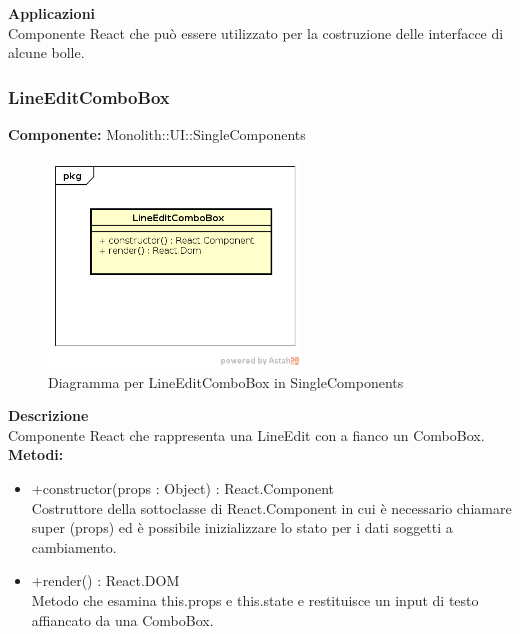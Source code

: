 \textbf{Applicazioni}\\
Componente React che può essere utilizzato per la costruzione delle interfacce di alcune bolle. 


\clearpage

\subsubsection{LineEditComboBox}
\textbf{Componente:}  Monolith::UI::SingleComponents\\
   \FloatBarrier
   \begin{figure}[ht]
   \centering
   \includegraphics[width=0.6\textwidth]{img/single-LineEditComboBox.png}
   \caption{{Diagramma per LineEditComboBox in SingleComponents}}
\end{figure}
\FloatBarrier
\textbf{Descrizione}\\
Componente React che rappresenta una LineEdit con a fianco un ComboBox. \\
\textbf{Metodi:} 
\begin{itemize}

\item +constructor(props : Object) : React.Component 
\\
Costruttore della sottoclasse di React.Component in cui è necessario chiamare super (props) ed è possibile inizializzare lo stato per i dati soggetti a cambiamento.

\item +render() : React.DOM 
\\
Metodo che esamina this.props e this.state e restituisce un input di testo affiancato da una ComboBox.

\end{itemize}

